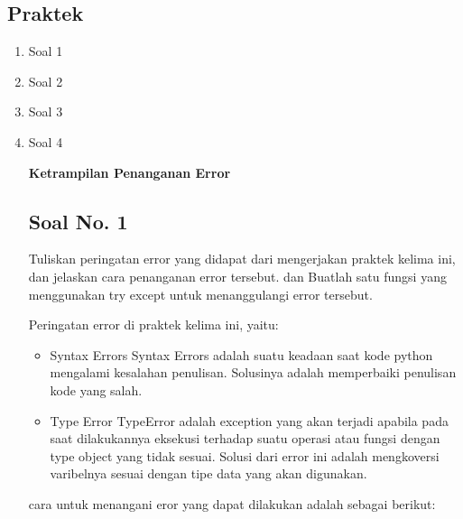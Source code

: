 \subsection{Praktek}
\begin{enumerate}
\item Soal 1


\item Soal 2


\item Soal 3


\item Soal 4


\hfill \break
{\Large \textbf{Ketrampilan Penanganan Error}}

\subsection{Soal No. 1}
Tuliskan  peringatan  error  yang  didapat  dari  mengerjakan  praktek  kelima  ini, dan  jelaskan  cara  penanganan  error  tersebut.   dan  Buatlah  satu  fungsi  yang menggunakan try except untuk menanggulangi error tersebut.

\hfill \break
Peringatan error di praktek kelima ini, yaitu:
\begin{itemize}
	\item Syntax Errors
	Syntax Errors adalah suatu keadaan saat kode python mengalami kesalahan penulisan. Solusinya adalah memperbaiki penulisan kode yang salah.
		
	\item Type Error
	TypeError adalah exception yang akan terjadi apabila pada saat dilakukannya eksekusi terhadap suatu operasi atau fungsi dengan type object yang tidak sesuai. Solusi dari error ini adalah mengkoversi varibelnya sesuai dengan tipe data yang akan digunakan.
\end{itemize}

cara untuk menangani eror yang dapat dilakukan adalah sebagai berikut:


\end{enumerate}


